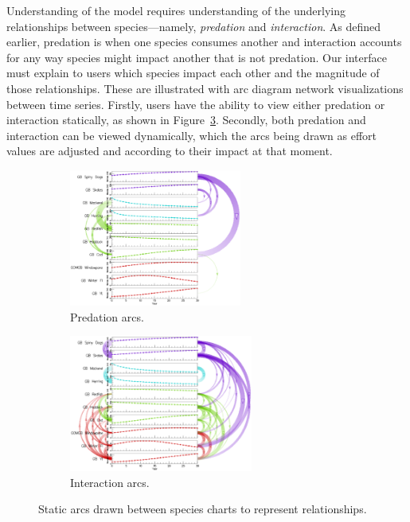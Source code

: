 Understanding of the model requires understanding of the underlying relationships between species---namely, \textit{predation} and \textit{interaction}.  As defined earlier, predation is when one species consumes another and interaction accounts for any way species might impact another that is not predation.  Our interface must explain to users which species impact each other and the magnitude of those relationships.  These are illustrated with arc diagram network visualizations between time series.  Firstly, users have the ability to view either predation or interaction statically, as shown in Figure~\ref{fig:betweenSpeciesArcs}.  Secondly, both predation and interaction can be viewed dynamically, which the arcs being drawn as effort values are adjusted and according to their impact at that moment.

\begin{figure}
\centering
	\begin{subfigure}[b]{0.48\textwidth}
		\centering
		\includegraphics[height=4.5cm]{figures/eps/arcs_predation.eps}
		\caption{Predation arcs.}
		\label{fig:arcsPredation}
	\end{subfigure}	
	\begin{subfigure}[b]{0.48\textwidth}
		\centering
		\includegraphics[height=4.5cm]{figures/eps/arcs_interaction.eps}
		\caption{Interaction arcs.}
		\label{fig:arcsInteraction}
	\end{subfigure}
	\caption{Static arcs drawn between species charts to represent relationships.}
	\label{fig:betweenSpeciesArcs}
\end{figure}

